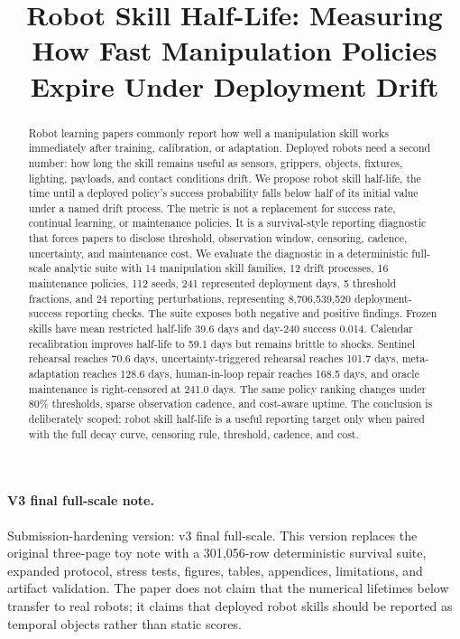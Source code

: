 \documentclass{article}
\title{Robot Skill Half-Life: Measuring How Fast Manipulation Policies Expire Under Deployment Drift}
\author{}
\begin{document}
\maketitle

\begin{abstract}
Robot learning papers commonly report how well a manipulation skill works
immediately after training, calibration, or adaptation. Deployed robots need a
second number: how long the skill remains useful as sensors, grippers, objects,
fixtures, lighting, payloads, and contact conditions drift. We propose robot
skill half-life, the time until a deployed policy's success probability falls
below half of its initial value under a named drift process. The metric is not a
replacement for success rate, continual learning, or maintenance policies. It is
a survival-style reporting diagnostic that forces papers to disclose threshold,
observation window, censoring, cadence, uncertainty, and maintenance cost. We
evaluate the diagnostic in a deterministic full-scale analytic suite with 14
manipulation skill families, 12 drift processes, 16 maintenance policies, 112
seeds, 241 represented deployment days, 5 threshold fractions, and 24 reporting
perturbations, representing 8,706,539,520 deployment-success reporting checks.
The suite exposes both negative and positive findings. Frozen skills have mean
restricted half-life 39.6 days and day-240 success 0.014. Calendar
recalibration improves half-life to 59.1 days but remains brittle to shocks.
Sentinel rehearsal reaches 70.6 days, uncertainty-triggered rehearsal reaches
101.7 days, meta-adaptation reaches 128.6 days, human-in-loop repair reaches
168.5 days, and oracle maintenance is right-censored at 241.0 days. The same
policy ranking changes under 80\% thresholds, sparse observation cadence, and
cost-aware uptime. The conclusion is deliberately scoped: robot skill half-life
is a useful reporting target only when paired with the full decay curve,
censoring rule, threshold, cadence, and cost.
\end{abstract}

\paragraph{V3 final full-scale note.}
Submission-hardening version: v3 final full-scale. This version replaces the
original three-page toy note with a 301,056-row deterministic survival suite,
expanded protocol, stress tests, figures, tables, appendices, limitations, and
artifact validation. The paper does not claim that the numerical lifetimes below
transfer to real robots; it claims that deployed robot skills should be reported
as temporal objects rather than static scores.
\end{document}
